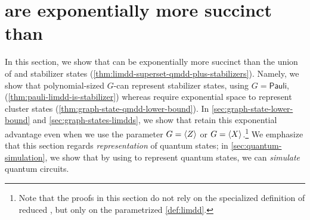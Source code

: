 \section{\limdds are exponentially more succinct than \qmdds}
\label{sec:exponential-separations}

In this section, we show that \limdds can be exponentially more succinct than the union of \qmdds and stabilizer states (\autoref{thm:limdd-superset-qmdd-plus-stabilizers}).
Namely, we show that polynomial-sized $G$-\limdds can represent stabilizer states, using $G=\textsf{Pauli}$, (\autoref{thm:pauli-limdd-is-stabilizer}) whereas \qmdds require exponential space to represent cluster states (\autoref{thm:graph-state-qmdd-lower-bound}).
In \autoref{sec:graph-state-lower-bound} and \autoref{sec:graph-states-limdds}, we show that \limdds retain this exponential advantage even when we use the parameter $G=\braket{Z}$ or $G=\braket{X}$.\footnote{Note that the proofs in this section do not rely on the specialized definition of reduced \limdds, but only on the parametrized \autoref{def:limdd}.}
We emphasize that this section regards \emph{representation} of quantum states; in \autoref{sec:quantum-simulation}, we show that by using \limdds to represent quantum states, we can \emph{simulate} quantum circuits.

